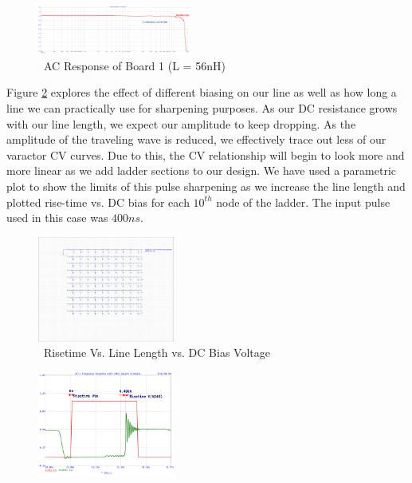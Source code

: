 \documentclass[journal]{IEEEtran}
\begin{document}
\begin{figure}[htb]
\centering
\includegraphics[width=0.45\textwidth,page = 1]{ACResponseB1.png}
\caption{\ AC Response of Board 1 (L = 56nH) 
}\label{fig:ACResp56nh}
\end{figure}
 
 Figure \ref{fig:RiseVsLineVsBias} explores the effect of different biasing on our line as well as how long a line we can practically use for sharpening purposes. As our DC resistance grows with our line length, we expect our amplitude to keep dropping. As the amplitude of the traveling wave is reduced, we effectively trace out less of our varactor CV curves. Due to this, the CV relationship will begin to look more and more linear as we add ladder sections to our design. We have used a parametric plot to show the limits of this pulse sharpening as we increase  the line length and plotted rise-time vs. DC bias for each $10^{th}$ node of the ladder. The input pulse used in this case was $400ns$. 

\begin{figure}[htb]
\centering
\includegraphics[width=0.4\textwidth,page = {3}]{RiseTimeVsDCBIASVsLength.pdf}
\caption{\ Risetime Vs. Line Length vs. DC Bias Voltage 
}\label{fig:RiseVsLineVsBias}
\end{figure}


\begin{figure}[htb]
\centering
\includegraphics[width=0.4\textwidth,page={1}]{Probed_Input_N10_N240_NoSeriesResistance.pdf}
\caption{\
}\label{fig:ProbedTransientNoSer}
\end{figure}
\end{document}
